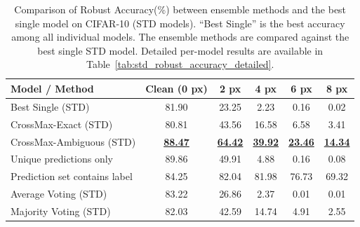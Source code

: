 \begin{table}[H]
\centering
\small
\caption{Comparison of Robust Accuracy(\%) between ensemble methods and the best single model on CIFAR-10 (STD models).  
    ``Best Single'' is the best accuracy among all individual models. 
    The ensemble methods are compared against the best single STD model. 
    Detailed per-model results are available in Table~\ref{tab:std_robust_accuracy_detailed}.}
\label{tab:ensemble_std_compact}
\begin{tabular}{lccccc}
\toprule
\textbf{Model / Method} & \textbf{Clean (0 px)} & \textbf{2 px} & \textbf{4 px} & \textbf{6 px} & \textbf{8 px} \\
\midrule
Best Single (STD)            & 81.90 & 23.25 &  2.23 &  0.16 &  0.02 \\
\midrule
CrossMax-Exact (STD)         & 80.81 & 43.56 & 16.58 &  6.58 &  3.41 \\
CrossMax-Ambiguous (STD)     & \underline{\textbf{88.47}} & \underline{\textbf{64.42}} & \underline{\textbf{39.92}} & \underline{\textbf{23.46}} & \underline{\textbf{14.34}} \\
\quad Unique predictions only & 89.86 & 49.91 &  4.88 &  0.16 &  0.08 \\
\quad Prediction set contains label & 84.25 & 82.04 & 81.98 & 76.73 & 69.32 \\
\midrule
Average Voting (STD)         & 83.22 & 26.86 &  2.37 &  0.01 &  0.01 \\
Majority Voting (STD)        & 82.03 & 42.59 & 14.74 &  4.91 &  2.55 \\
\bottomrule
\end{tabular}
\end{table}

